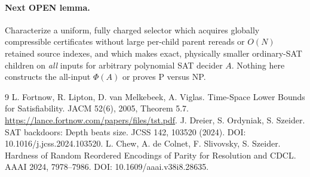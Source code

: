 \documentclass[11pt]{article}
\begin{document}
\paragraph{Next OPEN lemma.} Characterize a uniform, fully charged selector which acquires globally compressible certificates without large per-child parent rereads or $O(N)$ retained source indexes, and which makes exact, physically smaller ordinary-SAT children on \emph{all} inputs for arbitrary polynomial SAT decider $A$. Nothing here constructs the all-input $\Phi(A)$ or proves P versus NP.

\begin{thebibliography}{9}
 L. Fortnow, R. Lipton, D. van Melkebeek, A. Viglas. Time-Space Lower Bounds for Satisfiability. JACM 52(6), 2005, Theorem 5.7. \url{https://lance.fortnow.com/papers/files/tst.pdf}.
 J. Dreier, S. Ordyniak, S. Szeider. SAT backdoors: Depth beats size. JCSS 142, 103520 (2024). DOI: 10.1016/j.jcss.2024.103520.
 L. Chew, A. de Colnet, F. Slivovsky, S. Szeider. Hardness of Random Reordered Encodings of Parity for Resolution and CDCL. AAAI 2024, 7978--7986. DOI: 10.1609/aaai.v38i8.28635.
\end{thebibliography}
\end{document}
